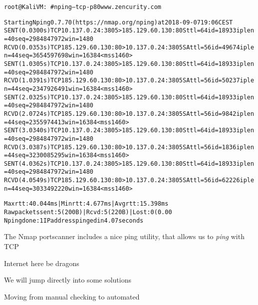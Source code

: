 \documentclass[Screen16to9,17pt]{foils}
\begin{document}

\begin{alltt}\footnotesize
  root@KaliVM:~# nping --tcp -p 80 www.zencurity.com

  Starting Nping 0.7.70 ( https://nmap.org/nping ) at 2018-09-07 19:06 CEST
  SENT (0.0300s) TCP 10.137.0.24:3805 > 185.129.60.130:80 S ttl=64 id=18933 iplen=40  seq=2984847972 win=1480
  RCVD (0.0353s) TCP 185.129.60.130:80 > 10.137.0.24:3805 SA ttl=56 id=49674 iplen=44  seq=3654597698 win=16384 <mss 1460>
  SENT (1.0305s) TCP 10.137.0.24:3805 > 185.129.60.130:80 S ttl=64 id=18933 iplen=40  seq=2984847972 win=1480
  RCVD (1.0391s) TCP 185.129.60.130:80 > 10.137.0.24:3805 SA ttl=56 id=50237 iplen=44  seq=2347926491 win=16384 <mss 1460>
  SENT (2.0325s) TCP 10.137.0.24:3805 > 185.129.60.130:80 S ttl=64 id=18933 iplen=40  seq=2984847972 win=1480
  RCVD (2.0724s) TCP 185.129.60.130:80 > 10.137.0.24:3805 SA ttl=56 id=9842 iplen=44  seq=2355974413 win=16384 <mss 1460>
  SENT (3.0340s) TCP 10.137.0.24:3805 > 185.129.60.130:80 S ttl=64 id=18933 iplen=40  seq=2984847972 win=1480
  RCVD (3.0387s) TCP 185.129.60.130:80 > 10.137.0.24:3805 SA ttl=56 id=1836 iplen=44  seq=3230085295 win=16384 <mss 1460>
  SENT (4.0362s) TCP 10.137.0.24:3805 > 185.129.60.130:80 S ttl=64 id=18933 iplen=40  seq=2984847972 win=1480
  RCVD (4.0549s) TCP 185.129.60.130:80 > 10.137.0.24:3805 SA ttl=56 id=62226 iplen=44  seq=3033492220 win=16384 <mss 1460>

  Max rtt: 40.044ms | Min rtt: 4.677ms | Avg rtt: 15.398ms
  Raw packets sent: 5 (200B) | Rcvd: 5 (220B) | Lost: 0 (0.00%)
  Nping done: 1 IP address pinged in 4.07 seconds
\end{alltt}

\begin{list2}
\item The Nmap portscanner includes a nice ping utility, that allows us to \emph{ping} with TCP
\end{list2}








\vskip 2cm
\centerline{\Large Internet here be dragons}

We will jump directly into some solutions




\centerline{\LARGE Moving from manual checking to automated}
\end{document}

